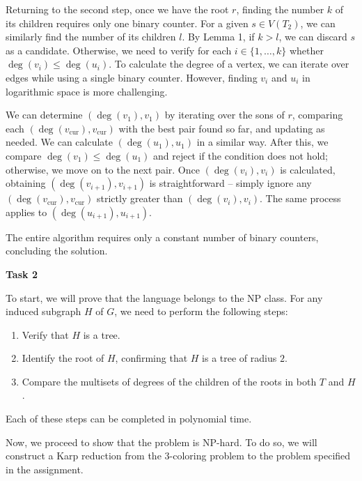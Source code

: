 \documentclass[12pt]{article}
\begin{document}
	\medskip
	
	Returning to the second step, once we have the root \(r\), finding the
	number \(k\) of its children requires only one binary counter. For a given
	\(s \in V(T_{2})\), we can similarly find the number of its children \(l\).
	By Lemma 1, if \(k > l\), we can discard \(s\) as a candidate. Otherwise, we
	need to verify for each \(i \in \{1, \ldots, k\}\) whether \(\deg(v_{i})
	\leqslant \deg(u_{i})\). To calculate the degree of a vertex, we can iterate
	over edges while using a single binary counter. However, finding \(v_{i}\)
	and \(u_{i}\) in logarithmic space is more challenging.
	
	\medskip
	
	We can determine \((\deg(v_{1}), v_{1})\) by iterating over the sons of
	\(r\), comparing each \((\deg(v_{\text{cur}}), v_{\text{cur}})\) with the
	best pair found so far, and updating as needed. We can calculate
	\((\deg(u_{1}), u_{1})\) in a similar way. After this, we compare
	\(\deg(v_{1}) \leqslant \deg(u_{1})\) and reject if the condition does not
	hold; otherwise, we move on to the next pair. Once \((\deg(v_{i}), v_{i})\)
	is calculated, obtaining \((\deg(v_{i + 1}), v_{i + 1})\) is straightforward
	-- simply ignore any \((\deg(v_{\text{cur}}), v_{\text{cur}})\) strictly
	greater than \((\deg(v_{i}), v_{i})\). The same process applies to
	\((\deg(u_{i + 1}), u_{i + 1})\).
	
	\medskip
	
	The entire algorithm requires only a constant number of binary counters,
	concluding the solution.
	
	\bigskip
	
	\textbf{Task 2}
	
	\medskip
	
	To start, we will prove that the language belongs to the NP class. For any
	induced subgraph \(H\) of \(G\), we need to perform the following steps:
	\begin{enumerate}
		\item Verify that \(H\) is a tree.
		\item Identify the root of \(H\), confirming that \(H\) is a tree of
		      radius \(2\).
		\item Compare the multisets of degrees of the children of the roots in
		      both \(T\) and \(H\).
	\end{enumerate}
	Each of these steps can be completed in polynomial time.
	
	\medskip
	
	Now, we proceed to show that the problem is NP-hard. To do so, we will
	construct a Karp reduction from the \(3\)-coloring problem to the problem
	specified in the assignment.
	
\end{document}
